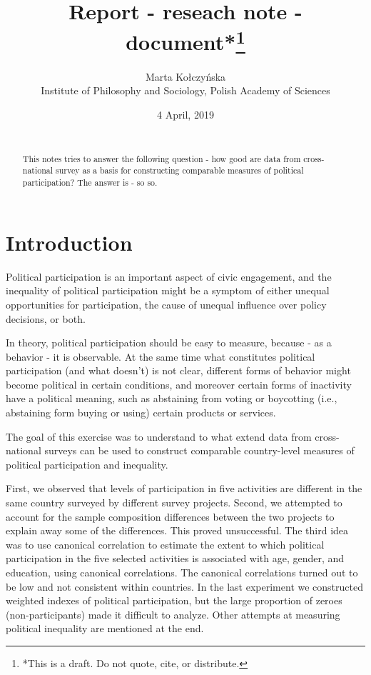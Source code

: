 \documentclass[12pt,]{article}
\title{\vspace{1cm}Report - reseach note - document*\footnote{*This is a draft. Do not quote, cite, or distribute.}\vspace{0.5cm}\\}
\author{Marta Kołczyńska\\
Institute of Philosophy and Sociology, Polish Academy of Sciences}
\date{4 April, 2019\\
~\\}
\begin{document}
\maketitle
\begin{abstract}
\noindent{}This notes tries to answer the following question - how good are data from cross-national survey as a basis for constructing comparable measures of political participation? The answer is - so so.\vspace{.8cm}
\end{abstract}

\clearpage

\renewcommand{\baselinestretch}{0.5}\normalsize
\tableofcontents
\renewcommand{\baselinestretch}{1.1}\normalsize

\clearpage

\hypertarget{introduction}{%
\section{Introduction}\label{introduction}}

Political participation is an important aspect of civic engagement, and the inequality of political participation might be a symptom of either unequal opportunities for participation, the cause of unequal influence over policy decisions, or both.

In theory, political participation should be easy to measure, because - as a behavior - it is observable. At the same time what constitutes political participation (and what doesn't) is not clear, different forms of behavior might become political in certain conditions, and moreover certain forms of inactivity have a political meaning, such as abstaining from voting or boycotting (i.e., abstaining form buying or using) certain products or services.

The goal of this exercise was to understand to what extend data from cross-national surveys can be used to construct comparable country-level measures of political participation and inequality.

First, we observed that levels of participation in five activities are different in the same country surveyed by different survey projects. Second, we attempted to account for the sample composition differences between the two projects to explain away some of the differences. This proved unsuccessful. The third idea was to use canonical correlation to estimate the extent to which political participation in the five selected activities is associated with age, gender, and education, using canonical correlations. The canonical correlations turned out to be low and not consistent within countries. In the last experiment we constructed weighted indexes of political participation, but the large proportion of zeroes (non-participants) made it difficult to analyze. Other attempts at measuring political inequality are mentioned at the end.
\end{document}
